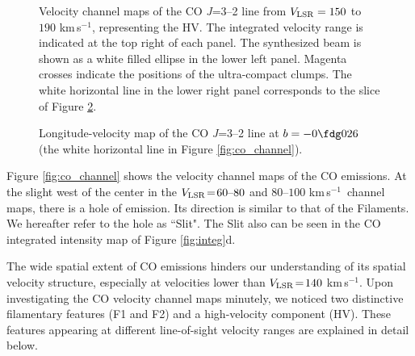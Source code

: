 \documentclass[twocolumn]{aastex631}
\newcommand\kms{\hbox{km$\,$s$^{-1}$}}
\newcommand\VLSR{\hbox{$V_{\rm LSR}$}}
\begin{document}
\begin{figure*}[htbp]
\centering
{}
\caption{Velocity channel maps of CO {\it J}=3--2 line emission. The velocity ranges are the same as Figure \ref{fig:h13cn}. The synthesized beam is shown as a white ellipse in the lower right panel. The autocorrelation maps, calculated by handling the boundaries by filling zero and normalizing each pixel value, are shown in the three panels. The highest contour level is 0.98 and the intervals are 0.05. The plotting region of each autocorrelation map corresponds to the spatial scale of 65\% region of the ALMA map. The three autocorrelation maps represent the characteristics of F1, F2, and HV. \label{fig:co_channel}}
\end{figure*}

\begin{figure}[htbp]
\centering
{}
\caption{Velocity channel maps of the CO {\it J}=3--2 line from $V_{\rm LSR} = 150$ to $190$ \kms , representing the HV. The integrated velocity range is indicated at the top right of each panel. The synthesized beam is shown as a white filled ellipse in the lower left panel. Magenta crosses indicate the positions of the ultra-compact clumps. The white horizontal line in the lower right panel corresponds to the slice of Figure \ref{fig:p-v}.
\label{fig:chv_channel}}
\end{figure}

\begin{figure}[ht!]
\centering
{}
\caption{Longitude-velocity map of the CO {\it J}=3--2 line at $b = -0\fdg 026$ (the white horizontal line in Figure \ref{fig:co_channel}).
\label{fig:p-v}}
\end{figure}

Figure \ref{fig:co_channel} shows the velocity channel maps of the CO emissions. At the slight west of the center in the $\VLSR\!=\!60\mbox{--}80$ and $80\mbox{--}100$ \kms\ channel maps, there is a hole of emission. Its direction is similar to that of the Filaments. We hereafter refer to the hole as ``Slit". The Slit also can be seen in the CO integrated intensity map of Figure \ref{fig:integ}d.

The wide spatial extent of CO emissions hinders our understanding of its spatial velocity structure, especially at velocities lower than $\VLSR\! =\! 140$ \kms . Upon investigating the CO velocity channel maps minutely, we noticed two distinctive filamentary features (F1 and F2) and a high-velocity component (HV). These features appearing at different line-of-sight velocity ranges are explained in detail below.
\end{document}
